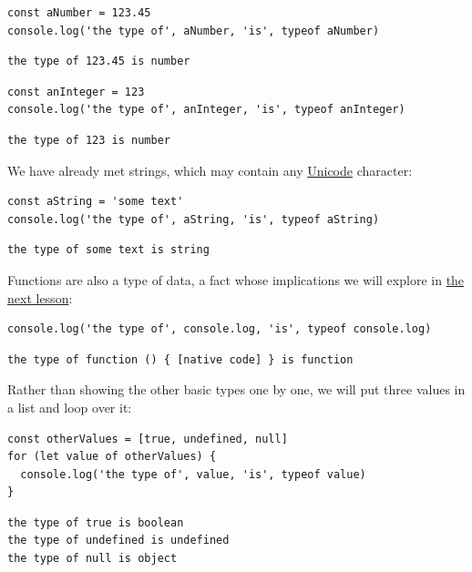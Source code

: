 \begin{verbatim}
const aNumber = 123.45
console.log('the type of', aNumber, 'is', typeof aNumber)
\end{verbatim}

\begin{verbatim}
the type of 123.45 is number
\end{verbatim}

\begin{verbatim}
const anInteger = 123
console.log('the type of', anInteger, 'is', typeof anInteger)
\end{verbatim}

\begin{verbatim}
the type of 123 is number
\end{verbatim}

We have already met strings, which may contain any
\protect\hyperlink{g:unicode}{Unicode} character:

\begin{verbatim}
const aString = 'some text'
console.log('the type of', aString, 'is', typeof aString)
\end{verbatim}

\begin{verbatim}
the type of some text is string
\end{verbatim}

Functions are also a type of data, a fact whose implications we will
explore in \protect\hyperlink{s:callbacks}{the next lesson}:

\begin{verbatim}
console.log('the type of', console.log, 'is', typeof console.log)
\end{verbatim}

\begin{verbatim}
the type of function () { [native code] } is function
\end{verbatim}

Rather than showing the other basic types one by one, we will put three
values in a list and loop over it:

\begin{verbatim}
const otherValues = [true, undefined, null]
for (let value of otherValues) {
  console.log('the type of', value, 'is', typeof value)
}
\end{verbatim}

\begin{verbatim}
the type of true is boolean
the type of undefined is undefined
the type of null is object
\end{verbatim}

